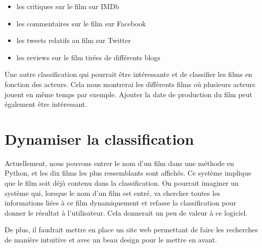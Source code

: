 \begin{itemize}
 \item les critiques sur le film sur IMDb
 \item les commentaires sur le film sur Facebook
 \item les tweets relatifs au film sur Twitter
 \item les reviews sur le film tirées de différents blogs
\end{itemize}

\vspace{0.4cm}
\newpage

Une autre classification qui pourrait être intéressante et de classifier les films en fonction des acteurs. Cela nous montrerai les différents films où plusieurs acteurs jouent en même temps par exemple. Ajouter la date de production du film peut également être intéressant.

\section{Dynamiser la classification}

Actuellement, nous pouvons entrer le nom d'un film dans une méthode en Python, et les dix films les plus ressemblants sont affichés. Ce système implique que le film soit déjà contenu dans la classification. On pourrait imaginer un système qui, lorsque le nom d'un film est entré, va chercher toutes les informations liées à ce film dynamiquement et refasse la classification pour donner le résultat à l'utilisateur. Cela donnerait un peu de valeur à ce logiciel.

De plus, il faudrait mettre en place un site web permettant de faire les recherches de manière intuitive et avec un beau design pour le mettre en avant.





